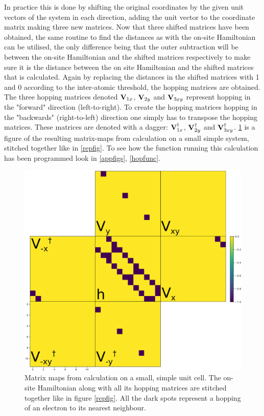 In practice this is done by shifting the original coordinates by the given unit vectors of the system in each direction, adding the unit vector to the coordinate matrix making three new matrices. Now that three shifted matrices have been obtained, the same routine to find the distances as with the on-site Hamiltonian can be utilised, the only difference being that the outer subtraction will be between the on-site Hamiltonian and the shifted matrices respectively to make sure it is the distance between the on site Hamiltonian and the shifted matrices that is calculated. Again by replacing the distances in the shifted matrices with 1 and 0 according to the inter-atomic threshold, the hopping matrices are obtained. The three hopping matrices denoted \(\vb{V}_{1x}\), \(\vb{V}_{2y}\) and \(\vb{V}_{3xy}\) represent hopping in the "forward" direction (left-to-right). To create the hopping matrices hopping in the "backwards" (right-to-left) direction one simply has to transpose the hopping matrices. These matrices are denoted with a dagger: \(\vb{V}_{1x}^{\dagger}\), \(\vb{V}_{2y}^{\dagger}\) and \(\vb{V}_{3xy}^{\dagger}\). \cref{matrixmap} is a figure of the resulting matrix-maps from calculation on a small simple system, stitched together like in \cref{repfig}. To see how the function running this calculation has been programmed look in \cref{appfigs}, \cref{hopfunc}.
\begin{figure}[H]
	\centering
	\includegraphics[width=\textwidth]{Figures/stitch.eps}
	\caption{Matrix maps from calculation on a small, simple unit cell. The on-site Hamiltonian along with all its hopping matrices are stitched together like in figure \cref{repfig}. All the dark spots represent a hopping of an electron to its nearest neighbour.}
	\label{matrixmap}
\end{figure}
